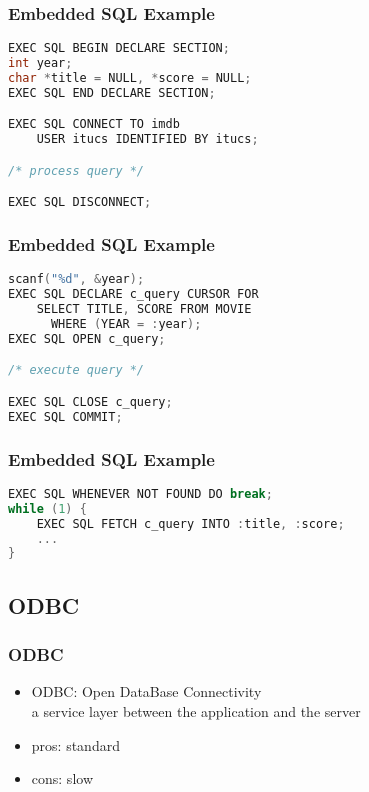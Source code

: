 \documentclass[dvipsnames]{beamer}
\theoremstyle{plain}
\begin{document}
\begin{frame}[fragile]
  \frametitle{Embedded SQL Example}

  \begin{example}[connecting]
    \begin{lstlisting}[language=C]
EXEC SQL BEGIN DECLARE SECTION;
int year;
char *title = NULL, *score = NULL;
EXEC SQL END DECLARE SECTION;

EXEC SQL CONNECT TO imdb
    USER itucs IDENTIFIED BY itucs;

/* process query */

EXEC SQL DISCONNECT;
    \end{lstlisting}
 \end{example}
\end{frame}

\begin{frame}[fragile]
  \frametitle{Embedded SQL Example}

  \begin{example}
    \begin{lstlisting}[language=C]
scanf("%d", &year);
EXEC SQL DECLARE c_query CURSOR FOR
    SELECT TITLE, SCORE FROM MOVIE
      WHERE (YEAR = :year);
EXEC SQL OPEN c_query;

/* execute query */

EXEC SQL CLOSE c_query;
EXEC SQL COMMIT;
    \end{lstlisting}
 \end{example}
\end{frame}

\begin{frame}[fragile]
  \frametitle{Embedded SQL Example}

  \begin{example}
    \begin{lstlisting}[language=C]
EXEC SQL WHENEVER NOT FOUND DO break;
while (1) {
    EXEC SQL FETCH c_query INTO :title, :score;
    ...
}
    \end{lstlisting}
 \end{example}
\end{frame}

\subsection{ODBC}

\begin{frame}[label=odbc]
  \frametitle{ODBC}

  \begin{itemize}
    \item \alert{ODBC}: Open DataBase Connectivity\\
      a service layer between the application and the server

    \pause
    \bigskip
    \item pros: standard
    \item cons: slow
  \end{itemize}
\end{frame}
\end{document}

